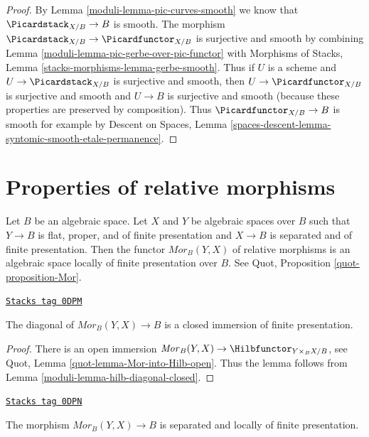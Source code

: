 \begin{proof}

By Lemma \ref{moduli-lemma-pic-curves-smooth} we know that
$\Picardstack_{X/B} \to B$ is smooth. The morphism
$\Picardstack_{X/B} \to \Picardfunctor_{X/B}$ is surjective
and smooth by combining Lemma \ref{moduli-lemma-pic-gerbe-over-pic-functor} with
Morphisms of Stacks, Lemma \ref{stacks-morphisms-lemma-gerbe-smooth}.
Thus if $U$ is a scheme and $U \to \Picardstack_{X/B}$ is surjective
and smooth, then $U \to \Picardfunctor_{X/B}$ is surjective and smooth
and $U \to B$ is surjective and smooth (because these properties
are preserved by composition). Thus $\Picardfunctor_{X/B} \to B$
is smooth for example by
Descent on Spaces, Lemma
\ref{spaces-descent-lemma-syntomic-smooth-etale-permanence}.
\end{proof}

\section{Properties of relative morphisms}
\label{moduli-section-relative-morphisms}
Let $B$ be an algebraic space. Let $X$ and $Y$ be algebraic spaces
over $B$ such that $Y \to B$ is flat, proper, and of finite presentation
and $X \to B$ is separated and of finite presentation.
Then the functor $\mathit{Mor}_B(Y, X)$ of relative morphisms
is an algebraic space locally of finite presentation over $B$.
See Quot, Proposition \ref{quot-proposition-Mor}.

\begin{lemma}
\label{moduli-lemma-Mor-diagonal-closed}
\href{https://stacks.math.columbia.edu/tag/0DPM}{\texttt{Stacks tag 0DPM}}

The diagonal of $\mathit{Mor}_B(Y, X) \to B$ is a closed immersion
of finite presentation.
\end{lemma}

\begin{proof}

There is an open immersion
$\mathit{Mor}_B(Y, X) \to \Hilbfunctor_{Y \times_B X/B}$, see
Quot, Lemma \ref{quot-lemma-Mor-into-Hilb-open}.
Thus the lemma follows from
Lemma \ref{moduli-lemma-hilb-diagonal-closed}.
\end{proof}

\begin{lemma}
\label{moduli-lemma-Mor-s-lfp}
\href{https://stacks.math.columbia.edu/tag/0DPN}{\texttt{Stacks tag 0DPN}}

The morphism $\mathit{Mor}_B(Y, X) \to B$ is separated
and locally of finite presentation.
\end{lemma}


